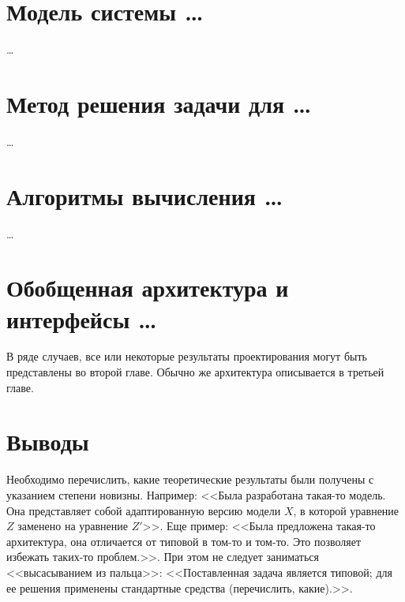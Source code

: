 \section{Модель системы \dots}

\dots




\section{Метод решения задачи для \dots}

\dots





\section{Алгоритмы вычисления \dots}

\dots





\section{Обобщенная архитектура и интерфейсы \dots}

В ряде случаев, все или некоторые результаты проектирования могут быть представлены во второй главе. Обычно же архитектура описывается в третьей главе.

\section{Выводы}

Необходимо перечислить, какие теоретические результаты были получены с 
указанием степени новизны. Например: <<Была разработана такая-то модель. Она 
представляет собой адаптированную версию модели $X$, в которой уравнение $Z$ 
заменено на уравнение $Z'$>>. Еще пример: <<Была предложена такая-то 
архитектура, она отличается от типовой в том-то и том-то. Это позволяет 
избежать таких-то проблем.>>. При этом не следует заниматься <<высасыванием из 
пальца>>: <<Поставленная задача является типовой; для ее решения применены 
стандартные средства (перечислить, какие).>>.

